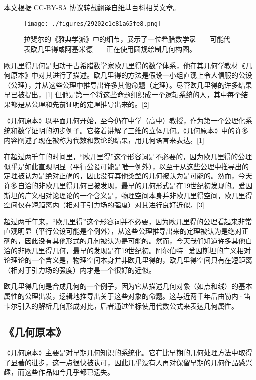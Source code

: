
本文根据 CC-BY-SA 协议转载翻译自维基百科\href{https://en.wikipedia.org/wiki/Euclidean_geometry#}{相关文章}。

\begin{figure}[ht]
\centering
\texttt{[image: ./figures/29202c1c81a65fe8.png]}
\caption{拉斐尔的《雅典学派》中的细节，展示了一位希腊数学家——可能代表欧几里得或阿基米德——正在使用圆规绘制几何构图。} \label{fig_OJLJH_1}
\end{figure}
欧几里得几何是归功于古希腊数学家欧几里得的数学体系，他在其几何学教材《几何原本》中对其进行了描述。欧几里得的方法是假设一小组直观上令人信服的公设（公理），并从这些公理中推导出许多其他命题（定理）。尽管欧几里得的许多结果早已被提出，[1] 但他是第一个将这些命题组织成一个逻辑系统的人，其中每个结果都是从公理和先前证明的定理推导出来的。[2]

《几何原本》以平面几何开始，至今仍在中学（高中）教授，作为第一个公理化系统和数学证明的初步例子。它接着讲解了三维的立体几何。《几何原本》中的许多内容阐述了现在被称为代数和数论的结果，用几何语言来表达。[1]

在超过两千年的时间里，“欧几里得”这个形容词是不必要的，因为欧几里得的公理似乎是如此直观明显（平行公设可能是唯一例外），以至于从这些公理中推导出的定理被认为是绝对正确的，因此没有其他类型的几何被认为是可能的。然而，今天许多自洽的非欧几里得几何已被发现，最早的几何形式是在19世纪初发现的。爱因斯坦的广义相对论理论的一个含义是，物理空间本身并非欧几里得空间，欧几里得空间仅在短距离内（相对于引力场的强度）对其进行良好近似。[3]

超过两千年来，“欧几里得”这个形容词并不必要，因为欧几里得的公理看起来非常直观明显（平行公设可能是个例外），从这些公理推导出来的定理被认为是绝对正确的，因此没有其他形式的几何被认为是可能的。然而，今天我们知道许多其他自洽的非欧几里得几何，最早的发现是在19世纪初。阿尔伯特·爱因斯坦的广义相对论理论的一个含义是，物理空间本身并非欧几里得的，欧几里得空间只有在短距离（相对于引力场的强度）内才是一个很好的近似。

欧几里得几何是合成几何的一个例子，因为它从描述几何对象（如点和线）的基本属性的公理出发，逻辑地推导出关于这些对象的命题。这与近两千年后由勒内·笛卡尔引入的解析几何形成对比，后者通过坐标使用代数公式来表达几何属性。
\subsection{《几何原本》}
《几何原本》主要是对早期几何知识的系统化。它在比早期的几何处理方法中取得了显著的进步，这一点很快被认可，因此几乎没有人再对保留早期的几何作品感兴趣，而这些作品如今几乎都已遗失。

